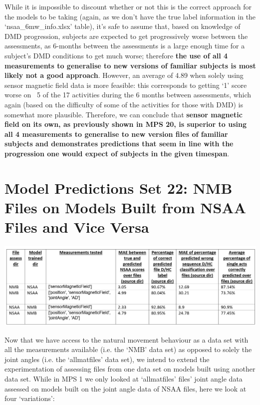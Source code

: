 \documentclass[12pt,twoside]{report}
\begin{document}
\quad While it is impossible to discount whether or not this is the correct approach for the models to be taking (again, as we don’t have the true label information in the ‘nsaa\_6mw\_info.xlsx’ table), it’s safe to assume that, based on knowledge of DMD progression, subjects are expected to get progressively worse between the assessments, as 6-months between the assessments is a large enough time for a subject’s DMD conditions to get much worse; therefore \textbf{the use of all 4 measurements to generalise to new versions of familiar subjects is most likely not a good approach}. However, an average of 4.89 when solely using sensor magnetic field data is more feasible: this corresponds to getting ‘1’ score worse on ~5 of the 17 activities during the 6 months between assessments, which again (based on the difficulty of some of the activities for those with DMD) is somewhat more plausible. Therefore, we can conclude that \textbf{sensor magnetic field on its own, as previously shown in MPS 20, is superior to using all 4 measurements to generalise to new version files of familiar subjects and demonstrates predictions that seem in line with the progression one would expect of subjects in the given timespan}.









\section{Model Predictions Set 22: NMB Files on Models Built from NSAA Files and Vice Versa}

\begin{center}
\includegraphics[scale=0.3]{project_figures/fig11_31}
\end{center}

\quad Now that we have access to the natural movement behaviour as a data set with all the measurements available (i.e. the ‘NMB’ data set) as opposed to solely the joint angles (i.e. the ‘allmatfiles’ data set), we intend to extend the experimentation of assessing files from one data set on models built using another data set. While in MPS 1 we only looked at ‘allmatfiles’ files’ joint angle data assessed on models built on the joint angle data of NSAA files, here we look at four ‘variations’:
\end{document}

